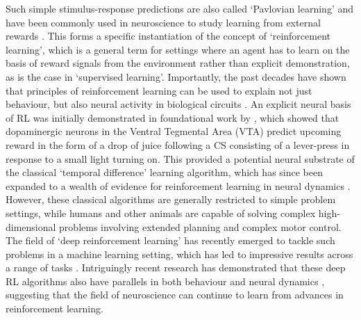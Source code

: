 Such simple stimulus-response predictions are also called `Pavlovian learning' and have been commonly used in neuroscience to study learning from external rewards \citep{niv2009reinforcement}.
This forms a specific instantiation of the concept of `reinforcement learning', which is a general term for settings where an agent has to learn on the basis of reward signals from the environment rather than explicit demonstration, as is the case in `supervised learning'.
Importantly, the past decades have shown that principles of reinforcement learning can be used to explain not just behaviour, but also neural activity in biological circuits \citep{niv2009reinforcement}.
An explicit neural basis of RL was initially demonstrated in foundational work by \citet{schultz1997neural}, which showed that dopaminergic neurons in the Ventral Tegmental Area (VTA) predict upcoming reward in the form of a drop of juice following a CS consisting of a lever-press in response to a small light turning on.
This provided a potential neural substrate of the classical `temporal difference' learning algorithm, which has since been expanded to a wealth of evidence for reinforcement learning in neural dynamics \citep{niv2009reinforcement, dabney2020distributional}.
However, these classical algorithms are generally restricted to simple problem settings, while humans and other animals are capable of solving complex high-dimensional problems involving extended planning and complex motor control.
The field of `deep reinforcement learning' has recently emerged to tackle such problems in a machine learning setting, which has led to impressive results across a range of tasks \citep{mnih2013playing, schrittwieser2020mastering, wurman2022outracing, vinyals2019grandmaster}.
Intriguingly recent research has demonstrated that these deep RL algorithms also have parallels in both behaviour and neural dynamics \citep{botvinick2020deep, wang2018prefrontal, dabney2020distributional, jensen2023recurrent}, suggesting that the field of neuroscience can continue to learn from advances in reinforcement learning.

